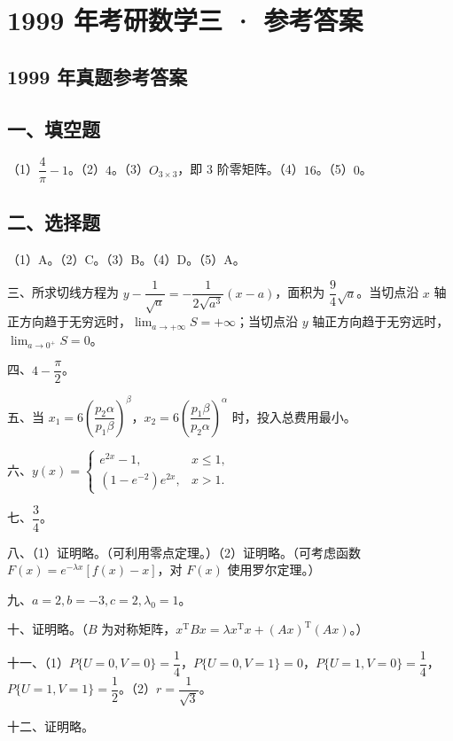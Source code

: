 \documentclass[UTF8,12pt]{ctexart}
\begin{document}
\section*{1999 年考研数学三 · 参考答案}
\subsection*{1999 年真题参考答案}

\subsection*{一、填空题}

（1）\(\displaystyle \dfrac{\displaystyle 4}{\displaystyle \pi}-1\)。（2）\(\displaystyle 4\)。（3）\(\displaystyle O_{3\times3}\)，即 3 阶零矩阵。（4）\(\displaystyle 16\)。（5）\(\displaystyle 0\)。


\subsection*{二、选择题}

（1）A。（2）C。（3）B。（4）D。（5）A。


三、所求切线方程为 \(\displaystyle y-\dfrac{\displaystyle 1}{\displaystyle \sqrt a}=-\dfrac{\displaystyle 1}{\displaystyle 2\sqrt{a^3}}(x-a)\)，面积为 \(\displaystyle \dfrac{\displaystyle 9}{\displaystyle 4}\sqrt a\)。当切点沿 \(\displaystyle x\) 轴正方向趋于无穷远时，\(\displaystyle \lim_{a\to+\infty}S=+\infty\)；当切点沿 \(\displaystyle y\) 轴正方向趋于无穷远时，\(\displaystyle \lim_{a\to0^+}S=0\)。


四、\(\displaystyle 4-\dfrac{\displaystyle \pi}{\displaystyle 2}\)。


五、当 \(\displaystyle x_1=6\left(\dfrac{\displaystyle p_2\alpha}{\displaystyle p_1\beta}\right)^\beta\)，\(\displaystyle x_2=6\left(\dfrac{\displaystyle p_1\beta}{\displaystyle p_2\alpha}\right)^\alpha\) 时，投入总费用最小。


六、\(\displaystyle y(x)=\begin{cases}e^{2x}-1,\allowbreak &x\le1,\allowbreak \\(1-e^{-2})e^{2x},\allowbreak &x>1.\end{cases}\)


七、\(\displaystyle \dfrac{\displaystyle 3}{\displaystyle 4}\)。


八、（1）证明略。（可利用零点定理。）（2）证明略。（可考虑函数 \(\displaystyle F(x)=e^{-\lambda x}[f(x)-x]\)，对 \(\displaystyle F(x)\) 使用罗尔定理。）


九、\(\displaystyle a=2,\allowbreak b=-3,\allowbreak c=2,\allowbreak \lambda_0=1\)。


十、证明略。（\(\displaystyle B\) 为对称矩阵，\(\displaystyle x^{\mathrm T}Bx=\lambda x^{\mathrm T}x+(Ax)^{\mathrm T}(Ax)\)。）


十一、（1）\(\displaystyle P\{U=0,\allowbreak V=0\}=\dfrac{\displaystyle 1}{\displaystyle 4}\)，\(\displaystyle P\{U=0,\allowbreak V=1\}=0\)，\(\displaystyle P\{U=1,\allowbreak V=0\}=\dfrac{\displaystyle 1}{\displaystyle 4}\)，\(\displaystyle P\{U=1,\allowbreak V=1\}=\dfrac{\displaystyle 1}{\displaystyle 2}\)。（2）\(\displaystyle r=\dfrac{\displaystyle 1}{\displaystyle \sqrt3}\)。


十二、证明略。
\end{document}
